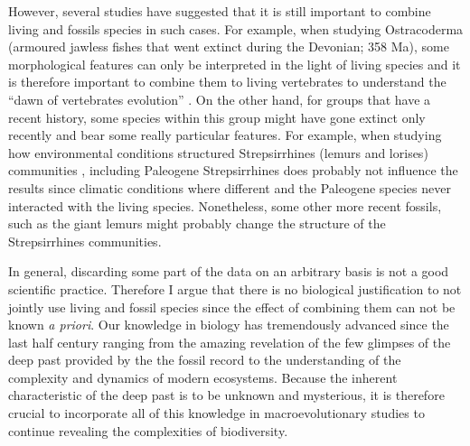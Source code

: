 However, several studies have suggested that it is still important to combine living and fossils species in such cases.
For example, when studying Ostracoderma (armoured jawless fishes that went extinct during the Devonian; 358 Ma), some morphological features can only be interpreted in the light of living species and it is therefore important to combine them to living vertebrates to understand the ``dawn of vertebrates evolution'' \citep{Janvier2015}.
On the other hand, for groups that have a recent history, some species within this group might have gone extinct only recently and bear some really particular features.
For example, when studying how environmental conditions structured Strepsirrhines (lemurs and lorises) communities \citep{Kamilar}, including Paleogene Strepsirrhines does probably not influence the results since climatic conditions where different and the Paleogene species never interacted with the living species.
Nonetheless, some other more recent fossils, such as the giant lemurs \citep[that went extinct only 600 years ago and were two order of magnitude bigger than living lemurs;][]{goodman2003introduction} might probably change the structure of the Strepsirrhines communities.

In general, discarding some part of the data on an arbitrary basis is not a good scientific practice.
Therefore I argue that there is no biological justification to not jointly use living and fossil species since the effect of combining them can not be known \textit{a priori}.
Our knowledge in biology has tremendously advanced since the last half century ranging from the amazing revelation of the few glimpses of the deep past provided by the the fossil record to the understanding of the complexity and dynamics of modern ecosystems.
Because the inherent characteristic of the deep past is to be unknown and mysterious, it is therefore crucial to incorporate all of this knowledge in macroevolutionary studies to continue revealing the complexities of biodiversity.


